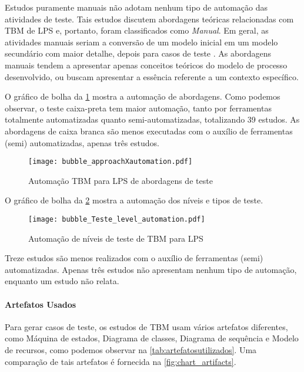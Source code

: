 Estudos puramente manuais não adotam nenhum tipo de automação das atividades de teste. Tais estudos discutem abordagens teóricas relacionadas com TBM de LPS e, portanto, foram classificados como \textit{Manual}. Em geral, as atividades manuais seriam a conversão de um modelo inicial em um modelo secundário com maior detalhe, depois para casos de teste \cite{lity2016applying, lochau2012parameterized, beohar2014spinal}. As abordagens manuais tendem a apresentar apenas conceitos teóricos do modelo de processo desenvolvido, ou buscam apresentar a essência referente a um contexto específico.

O gráfico de bolha da \ref{fig:approachXautomation} mostra a automação de abordagens. Como podemos observar, o teste caixa-preta tem maior automação, tanto por ferramentas totalmente automatizadas quanto semi-automatizadas, totalizando 39 estudos. As abordagens de caixa branca são menos executadas com o auxílio de ferramentas (semi) automatizadas, apenas três estudos.


\begin{figure}[!h]	
	\centering
	\texttt{[image: bubble\_approachXautomation.pdf]}
	\caption{Automação TBM para LPS de abordagens de teste}
	\label{fig:approachXautomation}
\end{figure}

O gráfico de bolha da \ref{fig:teste_levelxautomation} mostra a automação dos níveis e tipos de teste.

\begin{figure}[!h]
	\centering	
	\texttt{[image: bubble\_Teste\_level\_automation.pdf]}
	\caption{Automação de níveis de teste de TBM para LPS}
	\label{fig:teste_levelxautomation}
\end{figure}

Treze estudos são menos realizados com o auxílio de ferramentas (semi) automatizadas. Apenas três estudos não apresentam nenhum tipo de automação, enquanto um estudo não relata.


\paragraph{\textbf{Artefatos Usados}}

Para gerar casos de teste, os estudos de TBM usam vários artefatos diferentes, como Máquina de estados, Diagrama de classes, Diagrama de sequência e Modelo de recursos, como podemos observar na \ref{tab:artefatosutilizados}. Uma comparação de tais artefatos é fornecida na \ref{fig:chart_artifacts}.


